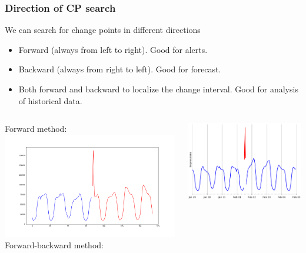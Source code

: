 \documentclass[intlimits, 9pt, unicode]{beamer}
\begin{document}
\begin{frame}
    \frametitle{Direction of CP search}
We can search for change points in different directions
\begin{itemize}
	\item Forward (always from left to right). Good for alerts.
\medskip
	\item Backward (always from right to left). Good for forecast.
\medskip
	\item Both forward and backward to localize the change interval. Good for analysis of historical data.
\end{itemize}

\smallskip
  \begin{columns}[T,onlytextwidth]
      Forward method:
	\includegraphics[scale=0.15]{images/022_point_cp_detected}
      Forward-backward method:
      
      \vspace*{0.3cm}
	\includegraphics[scale=0.15]{images/methods_comparison_4}
     \end{columns}


\end{frame}
\end{document}
